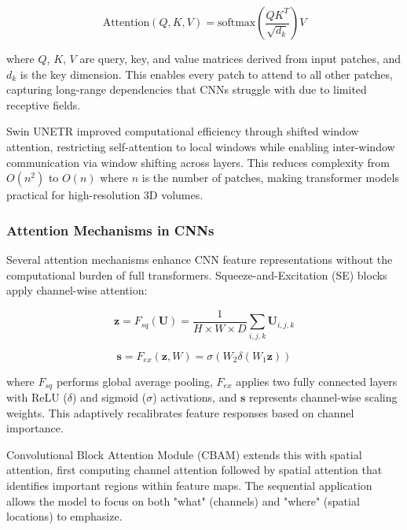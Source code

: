 \documentclass[conference]{IEEEtran}
\begin{document}
\begin{equation}
\text{Attention}(Q, K, V) = \text{softmax}\left(\frac{QK^T}{\sqrt{d_k}}\right)V
\end{equation}

where $Q$, $K$, $V$ are query, key, and value matrices derived from input patches, and $d_k$ is the key dimension. This enables every patch to attend to all other patches, capturing long-range dependencies that CNNs struggle with due to limited receptive fields.

Swin UNETR \cite{hatamizadeh2022swin} improved computational efficiency through shifted window attention, restricting self-attention to local windows while enabling inter-window communication via window shifting across layers. This reduces complexity from $O(n^2)$ to $O(n)$ where $n$ is the number of patches, making transformer models practical for high-resolution 3D volumes.

\subsubsection{Attention Mechanisms in CNNs}

Several attention mechanisms enhance CNN feature representations without the computational burden of full transformers. Squeeze-and-Excitation (SE) blocks \cite{hu2018squeeze} apply channel-wise attention:

\begin{equation}
\mathbf{z} = F_{sq}(\mathbf{U}) = \frac{1}{H \times W \times D} \sum_{i,j,k} \mathbf{U}_{i,j,k}
\end{equation}

\begin{equation}
\mathbf{s} = F_{ex}(\mathbf{z}, W) = \sigma(W_2 \delta(W_1 \mathbf{z}))
\end{equation}

where $F_{sq}$ performs global average pooling, $F_{ex}$ applies two fully connected layers with ReLU ($\delta$) and sigmoid ($\sigma$) activations, and $\mathbf{s}$ represents channel-wise scaling weights. This adaptively recalibrates feature responses based on channel importance.

Convolutional Block Attention Module (CBAM) \cite{woo2018cbam} extends this with spatial attention, first computing channel attention followed by spatial attention that identifies important regions within feature maps. The sequential application allows the model to focus on both "what" (channels) and "where" (spatial locations) to emphasize.
\end{document}

